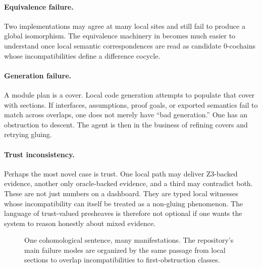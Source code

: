 \paragraph{Equivalence failure.}
Two implementations may agree at many local sites and still fail to produce a global
isomorphism. The equivalence machinery in  becomes much easier
to understand once local semantic correspondences are read as candidate $0$-cochains whose
incompatibilities define a difference cocycle.

\paragraph{Generation failure.}
A module plan is a cover. Local code generation attempts to populate that cover with sections.
If interfaces, assumptions, proof goals, or exported semantics fail to match across overlaps,
one does not merely have ``bad generation.'' One has an obstruction to descent. The agent is
then in the business of refining covers and retrying gluing.

\paragraph{Trust inconsistency.}
Perhaps the most novel case is trust. One local path may deliver Z3-backed evidence, another
only oracle-backed evidence, and a third may contradict both. These are not just numbers on a
dashboard. They are typed local witnesses whose incompatibility can itself be treated as a
non-gluing phenomenon. The language of trust-valued presheaves is therefore not optional if
one wants the system to reason honestly about mixed evidence.

\begin{figure}[h]
\centering
{}
\caption{One cohomological sentence, many manifestations. The repository's main failure modes are organized by the same passage from local sections to overlap incompatibilities to first-obstruction classes.}
\end{figure}

